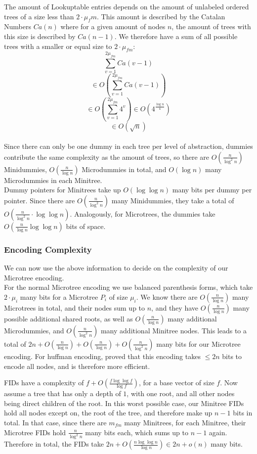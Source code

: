 \documentclass{article}
\begin{document}
The amount of Lookuptable entries depends on the amount of unlabeled ordered trees of a size less than $2 \cdot \mu_fm$. This amount is described by the Catalan Numbers $Ca(n)$ where for a given amount of nodes $n$, the amount of trees with this size is described by $Ca(n-1)$. We therefore have a sum of all possible trees with a smaller or equal size to $2\cdot \mu_{fm}$:
$$\sum_{v=1}^{2\mu_{fm}} Ca(v-1)$$
$$\in O\left( \sum_{v=1}^{2\mu_{fm}} Ca(v-1) \right)$$
$$\in O\left( \sum_{v=1}^{2\mu_{fm}} 4^{v} \right) \in O \left( 4^{\frac{\log n}{4}} \right)$$
$$\in O(\sqrt{n})$$\\

Since there can only be one dummy in each tree per level of abstraction, dummies contribute the same complexity as the amount of trees, so there are $O(\frac{n}{\log ^{2} n})$ Minidummies, $O(\frac{n}{\log {n}})$ Microdummies in total, and $O(\log n)$ many Microdummies in each Minitree.\\
Dummy pointers for Minitrees take up $O( \log \log n)$ many bits per dummy per pointer. Since there are $O(\frac{n}{\log ^{2} n})$ many Minidummies, they take a total of $O(\frac{n}{\log ^{2} n} \cdot \log \log n)$. Analogously, for Microtrees, the dummies take $O(\frac{n}{\log {n}} \log \log n)$ bits of space.

\subsubsection{Encoding Complexity} \label{Encoding Complexity}
We can now use the above information to decide on the complexity of our Microtree encoding.\\

For the normal Microtree encoding we use balanced parenthesis forms, which take $2 \cdot \mu_{i}$ many bits for a Microtree $P_{i}$ of size $\mu_{i}$. We know there are $O(\frac{n}{\log {n}})$ many Microtrees in total, and their nodes sum up to $n$, and they have $O(\frac{n}{\log {n}})$ many possible additional shared roots, as well as $O(\frac{n}{\log {n}})$ many additional Microdummies, and $O(\frac{n}{\log ^{2} n})$ many additional Minitree nodes.
This leads to a total of $2n + O(\frac{n}{\log {n}}) + O(\frac{n}{\log {n}}) + O(\frac{n}{\log ^{2} n})$ many bits for our Microtree encoding.
For huffman encoding, \cite{universalSuccinct} proved that this encoding takes $\leq 2n$ bits to encode all nodes, and is therefore more efficient.

FIDs have a complexity of $f + O\left( \frac{f \log \log f}{\log f} \right)$, for a base vector of size $f$. Now assume a tree that has only a depth of $1$, with one root, and all other nodes being direct children of the root. In this worst possible case, our Minitree FIDs hold all nodes except on, the root of the tree, and therefore make up $n-1$ bits in total. In that case, since there are $m_{fm}$ many Minitrees, for each Minitree, their Microtree FIDs hold $\frac{n}{\log ^{2}n}$ many bits each, which sums up to $n-1$ again.\\
Therefore in total, the FIDs take $2n + O\left( \frac{n \log \log n}{\log n} \right) \in 2n + o(n)$ many bits.
\end{document}

